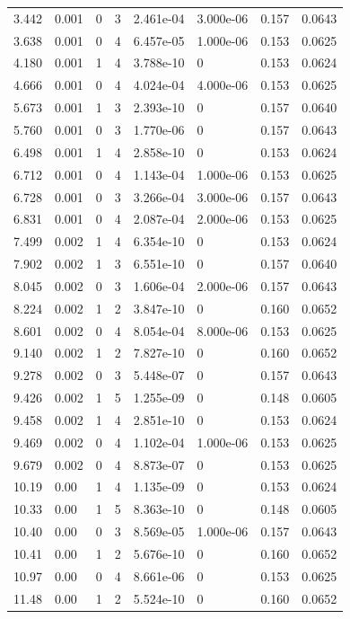 \documentclass[preview]{standalone}
\begin{document}
{{\begin{tabular}{L{1.2cm}C{1.2cm} C{0.3cm}C{0.5cm} C{1.4cm}C{1.4cm} C{1.4cm}C{1.4cm}}
  3.442  &  0.001  & 0     &  3 &  2.461e-04  & 3.000e-06  & 0.157 &  0.0643   \\ 
  3.638  &  0.001  & 0     &  4 &  6.457e-05  & 1.000e-06  & 0.153 &  0.0625   \\ 
  4.180  &  0.001  & 1     &  4 &  3.788e-10  & 0  & 0.153 &  0.0624   \\ 
  4.666  &  0.001  & 0     &  4 &  4.024e-04  & 4.000e-06  & 0.153 &  0.0625   \\ 
  5.673  &  0.001  & 1     &  3 &  2.393e-10  & 0  & 0.157 &  0.0640   \\ 
  5.760  &  0.001  & 0     &  3 &  1.770e-06  & 0  & 0.157 &  0.0643   \\ 
  6.498  &  0.001  & 1     &  4 &  2.858e-10  & 0  & 0.153 &  0.0624   \\ 
  6.712  &  0.001  & 0     &  4 &  1.143e-04  & 1.000e-06  & 0.153 &  0.0625   \\ 
  6.728  &  0.001  & 0     &  3 &  3.266e-04  & 3.000e-06  & 0.157 &  0.0643   \\ 
  6.831  &  0.001  & 0     &  4 &  2.087e-04  & 2.000e-06  & 0.153 &  0.0625   \\ 
  7.499  &  0.002  & 1     &  4 &  6.354e-10  & 0  & 0.153 &  0.0624   \\ 
  7.902  &  0.002  & 1     &  3 &  6.551e-10  & 0  & 0.157 &  0.0640   \\ 
  8.045  &  0.002  & 0     &  3 &  1.606e-04  & 2.000e-06  & 0.157 &  0.0643   \\ 
  8.224  &  0.002  & 1     &  2 &  3.847e-10  & 0  & 0.160 &  0.0652   \\ 
  8.601  &  0.002  & 0     &  4 &  8.054e-04  & 8.000e-06  & 0.153 &  0.0625   \\ 
  9.140  &  0.002  & 1     &  2 &  7.827e-10  & 0  & 0.160 &  0.0652   \\ 
  9.278  &  0.002  & 0     &  3 &  5.448e-07  & 0  & 0.157 &  0.0643   \\ 
  9.426  &  0.002  & 1     &  5 &  1.255e-09  & 0  & 0.148 &  0.0605   \\ 
  9.458  &  0.002  & 1     &  4 &  2.851e-10  & 0  & 0.153 &  0.0624   \\ 
  9.469  &  0.002  & 0     &  4 &  1.102e-04  & 1.000e-06  & 0.153 &  0.0625   \\ 
  9.679  &  0.002  & 0     &  4 &  8.873e-07  & 0  & 0.153 &  0.0625   \\ 
  10.19  &  0.00  & 1     &  4 &  1.135e-09  & 0  & 0.153 &  0.0624   \\ 
  10.33  &  0.00  & 1     &  5 &  8.363e-10  & 0  & 0.148 &  0.0605   \\ 
  10.40  &  0.00  & 0     &  3 &  8.569e-05  & 1.000e-06  & 0.157 &  0.0643   \\ 
  10.41  &  0.00  & 1     &  2 &  5.676e-10  & 0  & 0.160 &  0.0652   \\ 
  10.97  &  0.00  & 0     &  4 &  8.661e-06  & 0  & 0.153 &  0.0625   \\ 
  11.48  &  0.00  & 1     &  2 &  5.524e-10  & 0  & 0.160 &  0.0652   \\ 
\hline 
\end{tabular} 

}}
\end{document}

